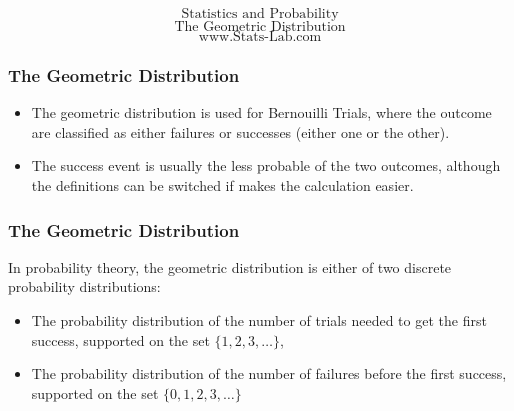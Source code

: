 \documentclass{beamer}
\begin{document}
\begin{frame}
\huge
\[ \mbox{Statistics and Probability} \]
\huge
\[ \mbox{The Geometric Distribution} \]
\Large
\[ \mbox{www.Stats-Lab.com} \]

\end{frame}
\begin{frame}
\frametitle{The Geometric Distribution}
\Large
\vspace{-1.5cm}
\begin{itemize}
\item The geometric distribution is used for Bernouilli Trials, where the outcome are classified as either failures or successes (either one or the other).
\item The success event is usually the less probable of the two outcomes, although the definitions can be switched if makes the calculation easier.
\end{itemize} 

\end{frame}

\begin{frame}
\frametitle{The Geometric Distribution}
\Large

In probability theory, the geometric distribution is either of two discrete probability distributions:
\begin{itemize}
\item The probability distribution of the number of trials needed to get the first success, supported on the set $\{ 1, 2, 3, \ldots\}$, \bigskip
\item The probability distribution of the number of failures before the first success, supported on the set $\{ 0, 1, 2, 3, \ldots\}$
\end{itemize}
\end{frame}
\end{document}
